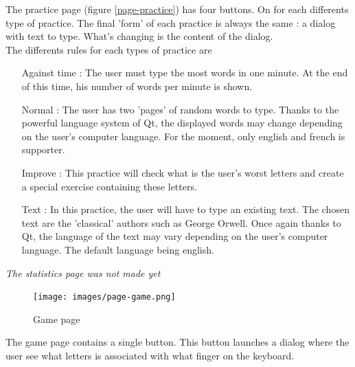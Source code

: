 The practice page  (figure \ref{page-practice}) has four buttons. On for each differents type of practice. The final 'form' of each practice is always the same : a dialog with text to type. What's changing is the content of the dialog.\\
The differents rules for each types of practice are 
\begin{enumerate}
	\item[Against time :] The user must type the most words in one minute. At the end of this time, his number of words per minute is shown.
	\item[Normal :] The user has two 'pages' of random words to type. Thanks to the powerful language system of Qt, the displayed words may change depending on the user's computer language. For the moment, only english and french is supporter.
	\item[Improve :] This practice will check what is the user's worst letters and create a special exercise containing these letters.
	\item[Text :] In this practice, the user will have to type an existing text. The chosen text are the 'classical' authors such as George Orwell. Once again thanks to Qt, the language of the text may vary depending on the user's computer language. The default language being english. 
\end{enumerate}

\textit{The statistics page was not made yet}

\begin{figure}[H]
	\centering
	\texttt{[image: images/page-game.png]}
	 \caption{Game page}
	 \label{page-game}
\end{figure}

The game page contains a single button. This button launches a dialog where the user see what letters is associated with what finger on the keyboard.

